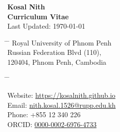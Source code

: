 \documentclass[10pt,a4paper]{article}
\begin{document}

\begin{center}
	\LARGE{\textbf{Kosal Nith}}\\
	\large{\textbf{Curriculum Vitae}\\
	\normalsize Last Updated:	\today}
\end{center}

\parbox{0.5\textwidth}{ %
	\begin{tabbing} %
		\hspace{3cm} \= \hspace{4cm} \= \kill %
		Royal University of Phnom Penh \\
		Russian Federation Blvd (110),  \\
		120404, Phnom Penh, Cambodia
		
		
\end{tabbing}}
\hfill %
\parbox{0.5\textwidth}{ %
	\begin{tabbing} %
		\hspace{3cm} \= \hspace{4cm} \= \kill %
		
		Website: \href{https://kosalnith.github.io/}{https://kosalnith.github.io} \\
		Email: \href{mailto:nith.kosal.1526@rupp.edu.kh}{nith.kosal.1526@rupp.edu.kh}\\
		Phone: +855 12 340 226 \\ 
		ORCID: \href{https://orcid.org/0000-0002-6976-4733}{0000-0002-6976-4733}  
\end{tabbing}}
\vspace{-1em}

\end{document}
